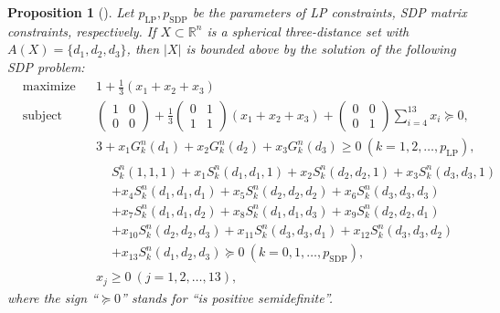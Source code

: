 \documentclass[12pt]{article}
\newtheorem{prop}[thm]{Proposition}
\theoremstyle{remark}
\newcommand{\RR}{\mathbb{R}}
\begin{document}
\begin{prop}[{\cite[Theorem~5]{Liu24}}]
\label{prop:SDP-primal}
Let $p_{\text{LP}}, p_{\text{SDP}}$ be the parameters of LP constraints, SDP matrix constraints, respectively.
If $X \subset \RR^n$ is a spherical three-distance set with 
$A(X)=\{d_1,d_2,d_3\}$,
then $|X|$ is bounded above by the solution of the following 
SDP problem:
\begin{subequations}
\begin{align*}
& \underset{}{\text{maximize}}
& & 1+\frac{1}{3}(x_1+x_2+x_3)\\%
& \text{subject to}
& & \begin{pmatrix}
1&0\\
0&0
\end{pmatrix}
+{\frac{1}{3}}
\begin{pmatrix}
0&1\\
1&1
\end{pmatrix}
(x_1+x_2+x_3) +
\begin{pmatrix}
0&0\\
0&1
\end{pmatrix}
\sum_{i=4}^{13} x_i 
\succeq 0, \\%
&&& 3+x_1 G_{k}^{n}(d_1)+x_2 G_{k}^{n}(d_2)+x_3 G_{k}^{n}(d_3)\geq 0\ (k=1,2,\ldots,p_{\text{LP}}), \\%
&&& 
\begin{aligned}
&S_{k}^{n}(1,1,1)+x_1 S_{k}^{n}(d_1,d_1,1)
+x_2 S_{k}^{n}(d_2,d_2,1)+x_3 S_{k}^{n}(d_3,d_3,1)\\
&+x_4 S_{k}^{n}(d_1,d_1,d_1)
+x_5 S_{k}^{n}(d_2,d_2,d_2)
+x_6 S_{k}^{n}(d_3,d_3,d_3)\\
&+x_7 S_{k}^{n}(d_1,d_1,d_2)
+x_8 S_{k}^{n}(d_1,d_1,d_3)
+x_9 S_{k}^{n}(d_2,d_2,d_1)\\
&+x_{10} S_{k}^{n}(d_2,d_2,d_3)
+x_{11} S_{k}^{n}(d_3,d_3,d_1)
+x_{12} S_{k}^{n}(d_3,d_3,d_2)\\
&+x_{13} S_{k}^{n}(d_1,d_2,d_3)  \succeq  0\ (k=0,1,\ldots,p_{\text{SDP}}), 
\end{aligned} \\%
&&& x_j  \geq 0 \ (j=1,2,\ldots,13), %
\end{align*}
\end{subequations}
where the sign ``$\succeq 0$'' stands for ``is positive semidefinite''.
\end{prop}
\end{document}
